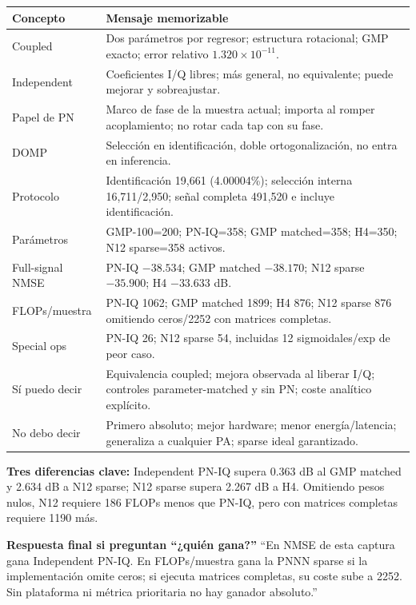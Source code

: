 \documentclass[10pt,a4paper]{article}
\begin{document}
\begin{tabularx}{\linewidth}{@{}p{.22\linewidth}X@{}}
\toprule
Concepto & Mensaje memorizable\\
\midrule
Coupled & Dos parámetros por regresor; estructura rotacional; GMP exacto; error relativo $1.320\times10^{-11}$.\\
Independent & Coeficientes I/Q libres; más general, no equivalente; puede mejorar y sobreajustar.\\
Papel de PN & Marco de fase de la muestra actual; importa al romper acoplamiento; no rotar cada tap con su fase.\\
DOMP & Selección en identificación, doble ortogonalización, no entra en inferencia.\\
Protocolo & Identificación 19,661 (4.00004\%); selección interna 16,711/2,950; señal completa 491,520 e incluye identificación.\\
Parámetros & GMP-100=200; PN-IQ=358; GMP matched=358; H4=350; N12 sparse=358 activos.\\
Full-signal NMSE & PN-IQ $-38.534$; GMP matched $-38.170$; N12 sparse $-35.900$; H4 $-33.633$ dB.\\
FLOPs/muestra & PN-IQ 1062; GMP matched 1899; H4 876; N12 sparse 876 omitiendo ceros/2252 con matrices completas.\\
Special ops & PN-IQ 26; N12 sparse 54, incluidas 12 sigmoidales/exp de peor caso.\\
Sí puedo decir & Equivalencia coupled; mejora observada al liberar I/Q; controles parameter-matched y sin PN; coste analítico explícito.\\
No debo decir & Primero absoluto; mejor hardware; menor energía/latencia; generaliza a cualquier PA; sparse ideal garantizado.\\
\bottomrule
\end{tabularx}

\vspace{5mm}
\textbf{Tres diferencias clave:}
Independent PN-IQ supera 0.363 dB al GMP matched y 2.634 dB a N12 sparse;
N12 sparse supera 2.267 dB a H4. Omitiendo pesos nulos, N12 requiere 186 FLOPs
menos que PN-IQ, pero con matrices completas requiere 1190 más.

\textbf{Respuesta final si preguntan ``¿quién gana?''}
``En NMSE de esta captura gana Independent PN-IQ. En FLOPs/muestra gana la PNNN
sparse si la implementación omite ceros; si ejecuta matrices completas, su coste
sube a 2252. Sin plataforma ni métrica prioritaria no hay ganador absoluto.''
\end{document}
